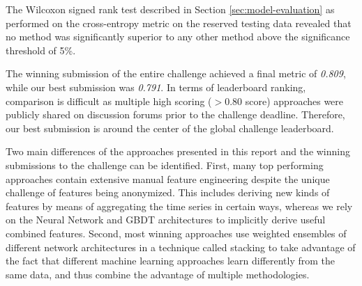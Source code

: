 \documentclass[runningheads]{llncs}
\begin{document}
The Wilcoxon signed rank test described in Section \ref{sec:model-evaluation} as performed on the cross-entropy metric on the reserved testing data revealed that no method was significantly superior to any other method above the significance threshold of 5\%.

The winning submission of the entire challenge achieved a final metric of \emph{0.809}, while our best submission was \emph{0.791}. In terms of leaderboard ranking, comparison is difficult as multiple high scoring ($>0.80$ score) approaches were publicly shared on discussion forums prior to the challenge deadline. Therefore, our best submission is around the center of the global challenge leaderboard.


Two main differences of the approaches presented in this report and the winning submissions to the challenge can be identified. First, many top performing approaches contain extensive manual feature engineering despite the unique challenge of features being anonymized. This includes deriving new kinds of features by means of aggregating the time series in certain ways, whereas we rely on the Neural Network and GBDT architectures to implicitly derive useful combined features. Second, most winning approaches use weighted ensembles of different network architectures in a technique called stacking to take advantage of the fact that different machine learning approaches learn differently from the same data, and thus combine the advantage of multiple methodologies. 










\end{document}
